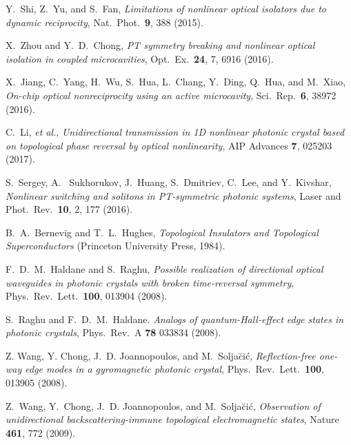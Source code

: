 \documentclass[aps,prx,twocolumn,superscriptaddress]{revtex4-1}
\begin{document}
\begin{thebibliography}{99}
 Y.~Shi, Z.~Yu, and S.~Fan,
  \textit{Limitations of nonlinear optical isolators due to dynamic reciprocity},
  Nat.~Phot.~\textbf{9}, 388 (2015).

 X.~Zhou and Y.~D.~Chong, \textit{PT symmetry breaking and nonlinear optical isolation in coupled microcavities}, Opt.~Ex.~\textbf{24}, 7, 6916 (2016).

  X.~Jiang, C.~Yang, H.~Wu, S.~Hua, L.~Chang, Y.~Ding, Q.~Hua, and M.~Xiao,
  \textit{On-chip optical nonreciprocity using an active microcavity}, 
  Sci.~Rep.~\textbf{6}, 38972 (2016).


  C.~Li, \textit{et al.}, \textit{Unidirectional transmission in 1D nonlinear photonic crystal based on topological phase reversal by optical nonlinearity},
  AIP Advances \textbf{7}, 025203 (2017).



S.~Sergey, A. ~Sukhorukov, J.~Huang, S.~Dmitriev, C.~Lee, and Y.~Kivshar, \textit{Nonlinear switching and solitons in PT‐symmetric photonic systems},
  Laser and Phot.~Rev.~\textbf{10}, 2, 177 (2016).






B.~A.~Bernevig and T.~L.~Hughes, \textit{Topological Insulators and Topological Superconductors} (Princeton University Press, 1984).

  F.~D.~M.~Haldane and S.~Raghu, \textit{Possible realization of directional optical waveguides in photonic crystals with broken time-reversal symmetry}, Phys.~Rev.~Lett.~\textbf{100}, 013904 (2008).

  S.~Raghu and F.~D.~M.~Haldane. \textit{Analogs of quantum-Hall-effect edge states in photonic crystals}, Phys.~Rev.~A \textbf{78} 033834 (2008).

  Z. Wang, Y. Chong, J.~D. Joannopoulos, and M.~Solja\u{c}i\'{c},
  \textit{Reflection-free one-way edge modes in a gyromagnetic photonic crystal}, Phys.~Rev.~Lett.~\textbf{100}, 013905 (2008).

  Z.~Wang, Y.~Chong, J.~D. Joannopoulos, and M.~Solja\u{c}i\'{c}, {\it Observation of unidirectional backscattering-immune topological electromagnetic states}, Nature {\bf 461}, 772 (2009).


\end{thebibliography}
\end{document}

